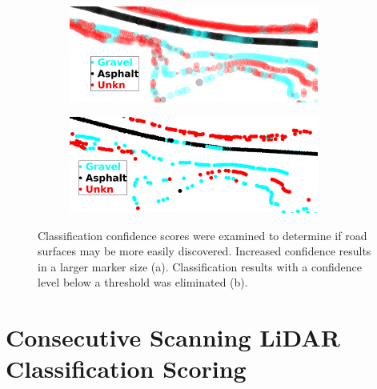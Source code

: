 \documentclass[numbered,pdftex]{ohio-etd}
\begin{document}
{{		\begin{figure}[H]
			\centering
			\begin{subfigure}[b]{\textwidth}
				\centering
				\includegraphics[width=0.9\textwidth]{Defense_Images/range_db_4_conf_size_example}
				\caption{}
				\label{fig:range_db_4_conf_size_example}
			\end{subfigure}
			\vspace{1cm} %
			\begin{subfigure}[b]{\textwidth}
				\centering
				\includegraphics[width=0.9\textwidth]{Defense_Images/range_db_4_conf_trim_example}
				\caption{}
				\label{fig:range_db_4_conf_trim_example}
			\end{subfigure}
			\caption[]{Classification confidence scores were examined to determine if road surfaces may be more easily discovered. Increased confidence results in a larger marker size (a). Classification results with a confidence level below a threshold was eliminated (b).}
			\label{fig:conf_results}
		\end{figure}
		
	} %
	
	
	\section{Consecutive Scanning LiDAR Classification Scoring}\label{sec:consec_class_scoring}{
		
}}
\end{document}
